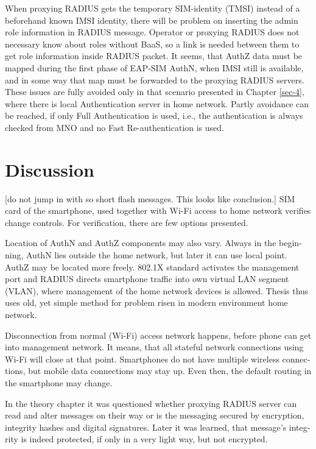 \documentclass[12pt,a4paper,english]{tutthesis}
\begin{document}
\begin{otherlanguage}{english}
When proxying RADIUS gets the temporary SIM-identity (TMSI) instead of
a beforehand known IMSI identity, there will be problem
on inserting the admin role information in RADIUS message.
Operator or proxying RADIUS 
does not necessary know about roles without BaaS, so a link
is needed between them to get role information inside RADIUS packet.
It seems, that AuthZ data must be mapped during the first phase of
EAP-SIM AuthN, when IMSI still is available, and in some way
that map must be forwarded to the proxying RADIUS servers.
These issues are fully avoided only in that scenario presented in Chapter
\ref{sec-4}, where there is local Authentication server in home network.
Partly avoidance can be reached, if only Full Authentication is
used, i.e., the authentication is always checked from MNO and no Fast
Re-authentication is used.

\section{Discussion}
\label{sec-6-5}


[do not jump in with so short flash messages. This looks like conclusion.] 
SIM card of the smartphone, used together with Wi-Fi access to home network 
verifies change controls. For verification, there are few options presented.

Location of AuthN and AuthZ components may also vary.
Always in the beginning, AuthN lies outside the home network, but
later it can use local point. AuthZ may be located more freely.
802.1X standard activates the management port and
RADIUS directs smartphone traffic into own virtual LAN segment (VLAN),
where management of the home network devices is allowed.
Thesis thus uses old, yet simple method for problem risen in modern environment home network.

Disconnection from normal (Wi-Fi) access network happens, before phone can get
into management network. It means, that all stateful network
connections using Wi-Fi will close at that point. Smartphones do not
have multiple wireless connections, but mobile data connections may 
stay up. Even then, the default routing in the smartphone may change.

In the theory chapter it was questioned whether proxying RADIUS server
can read and alter messages on their way or is the messaging secured
by encryption, integrity hashes and digital signatures.
Later it was learned, that message's integrity is indeed protected, if
only in a very light way, but not encrypted.



\end{otherlanguage}
\end{document}
